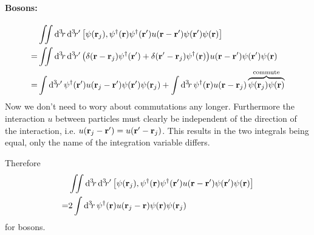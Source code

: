 \documentclass[11pt,letter, swedish, english
]{article}
\begin{document}
\paragraph{Bosons:} 
\begin{equation}
\begin{aligned}
&\iint\rd^3\!r\,\rd^3\!r'\,
\comm{\psi(\vb{r}_j)}{
\psi^\dagger(\vb{r})\psi^\dagger(\vb{r}')
u(\vb{r}-\vb{r}')\psi(\vb{r}')\psi(\vb{r})}\\
=&\iint\rd^3\!r\,\rd^3\!r'\,
\qty(
\delta(\vb{r}-\vb{r}_j) \psi^\dagger(\vb{r}')
+\delta(\vb{r}'-\vb{r}_j)\psi^\dagger(\vb{r})
)
u(\vb{r}-\vb{r}')\psi(\vb{r}')\psi(\vb{r})\\
=&\int\rd^3\!r'\,
\psi^\dagger(\vb{r}')u(\vb{r}_j-\vb{r}')\psi(\vb{r}')\psi(\vb{r}_j)
+\int\rd^3\!r\,
\psi^\dagger(\vb{r})u(\vb{r}-\vb{r}_j)
\commute{\psi(\vb{r}_j)\psi(\vb{r})}
\end{aligned}
\end{equation}
Now we don't need to wory about commutations any longer.
Furthermore the interaction $u$ between particles must clearly be
independent of the direction of the interaction,
i.e. $u(\vb{r}_j-\vb{r}')=u(\vb{r}'-\vb{r}_j)$. This results in the
two integrals being equal, only the name of the integration variable
differs. 

Therefore
\begin{equation}\label{eq:4_comm_ii_bose}
\begin{aligned}
&\iint\rd^3\!r\,\rd^3\!r'\,
\comm{\psi(\vb{r}_j)}{
\psi^\dagger(\vb{r})\psi^\dagger(\vb{r}')
u(\vb{r}-\vb{r}')\psi(\vb{r}')\psi(\vb{r})}\\
=&2\int\rd^3\!r\,
\psi^\dagger(\vb{r})u(\vb{r}_j-\vb{r})\psi(\vb{r})\psi(\vb{r}_j)
\end{aligned}
\end{equation}
for bosons.
\end{document}

